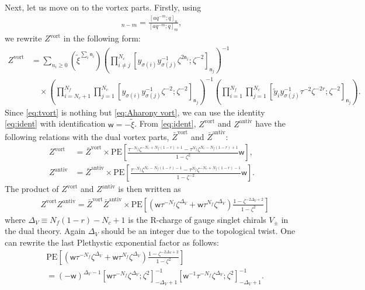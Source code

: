 \documentclass[a4paper,11pt]{article}
\begin{document}
Next, let us move on to the vortex parts. Firstly, using
\begin{align}
[a;q]_{n-m} = \frac{\left[a q^{-m};q\right]_n}{\left[a q^{-m};q\right]_m},
\end{align}
we rewrite $Z^\text{vort}$ in the following form:
\begin{align}
\label{eq:tvort}
%
Z^\text{vort} &= \sum_{n_i \geq 0} \left(\tilde \xi^{\sum_i \mathsf n_i}\right) \left(\prod_{i \neq j}^{N_c} \left[y_{\sigma(i)} y_{\sigma(j)}^{-1} \zeta^{2 \mathsf n_i};\zeta^{-2}\right]_{\mathsf n_j}\right)^{-1} \nonumber \\
%
& \quad \times \left(\prod_{i = N_c+1}^{N_f} \prod_{j = 1}^{N_c} \left[y_{\sigma(i)} y_{\sigma(j)}^{-1} \zeta^{-2};\zeta^{-2}\right]_{\mathsf n_j}\right)^{-1} \left(\prod_{i = 1}^{N_f} \prod_{j = 1}^{N_c} \left[\tilde y_i y_{\sigma(j)}^{-1} \tau^{-2} \zeta^{-2 r};\zeta^{-2}\right]_{\mathsf n_j}\right).
%
\end{align}
Since \eqref{eq:tvort} is nothing but \eqref{eq:Aharony vort}, we can use the identity \eqref{eq:ident} with identification $\mathsf w = -\tilde \xi$. From \eqref{eq:ident}, $Z^\text{vort}$ and $Z^\text{antiv}$ have the following relations with the dual vortex parts, $\bar Z^\text{vort}$ and $\bar Z^\text{antiv}$:
\begin{align}
%
Z^\text{vort} &= \bar Z^\text{vort} \times \mathrm{PE}\left[\frac{\tau^{-N_f} \zeta^{-N_c+N_f (1-r)+1}-\tau^{N_f} \zeta^{N_c-N_f (1-r)+1}}{1-\zeta^2} \mathsf w \right], \\
%
Z^\text{antiv} &= \bar Z^\text{antiv} \times \mathrm{PE}\left[\frac{\tau^{-N_f} \zeta^{N_c-N_f (1-r)-1}-\tau^{N_f} \zeta^{-N_c+N_f (1-r)-1}}{1-\zeta^{-2}} \mathsf w \right].
%
\end{align}
The product of $Z^\text{vort}$ and $Z^\text{antiv}$ is then written as
\begin{align}
& Z^\text{vort} Z^\text{antiv} = \bar Z^\text{vort} \bar Z^\text{antiv} \times \mathrm{PE}\left[\left(\mathsf w \tau^{-N_f} \zeta^{\Delta_V}+\mathsf w \tau^{N_f} \zeta^{\Delta_V}\right) \frac{1-\zeta^{-2 \Delta_V+2}}{1-\zeta^2}\right]
\end{align}
where $\Delta_V \equiv N_f (1-r)-N_c+1$ is the R-charge of gauge singlet chirals $V_\pm$ in the dual theory. Again $\Delta_V$ should be an integer due to the topological twist. One can rewrite the last Plethystic exponential factor as follows:
\begin{align}
\label{eq:tV}
%
& \mathrm{PE}\left[\left(\mathsf w \tau^{-N_f} \zeta^{\Delta_V}+\mathsf w \tau^{N_f} \zeta^{\Delta_V}\right) \frac{1-\zeta^{-2 \Delta_V+2}}{1-\zeta^2}\right] \nonumber \\
&= \left(-\mathsf w\right)^{\Delta_V-1} \left[\mathsf w \tau^{-N_f} \zeta^{\Delta_V};\zeta^2\right]_{-\Delta_V+1}^{-1} \left[\mathsf w^{-1} \tau^{-N_f} \zeta^{\Delta_V};\zeta^2\right]_{-\Delta_V+1}^{-1}.
%
\end{align}
\end{document}
